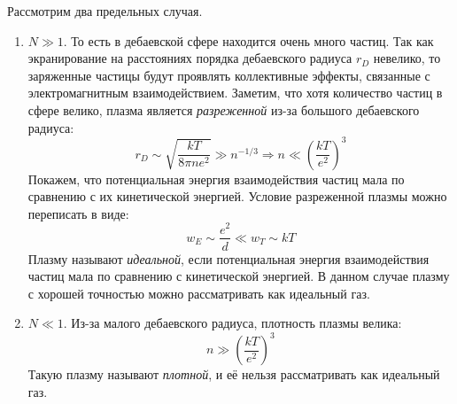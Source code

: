 Рассмотрим два предельных случая.
\begin{enumerate}
	\item $N \gg 1$. То есть в дебаевской сфере находится очень много частиц. Так как экранирование на расстояниях порядка дебаевского радиуса $r_D$ невелико, то заряженные частицы будут проявлять коллективные эффекты, связанные с электромагнитным взаимодействием. Заметим, что хотя количество частиц в сфере велико, плазма является \textit{разреженной} из-за большого дебаевского радиуса:
	$$
	r_D \sim \sqrt{\frac{kT}{8 \pi n e^2}} \gg n^{-1/3} \Rightarrow n \ll \left( \frac{kT}{e^2} \right)^3
	$$
	Покажем, что потенциальная энергия взаимодействия частиц мала по сравнению с их кинетической энергией. Условие разреженной плазмы можно переписать в виде:
	$$w_E \sim \frac{e^2}{d} \ll w_T \sim kT$$
	Плазму называют \textit{идеальной}, если потенциальная энергия взаимодействия частиц мала по сравнению с кинетической энергией. В данном случае плазму с хорошей точностью можно рассматривать как идеальный газ.
	
	\item $N \ll 1$. Из-за малого дебаевского радиуса, плотность плазмы велика:
	$$n \gg \left( \frac{kT}{e^2} \right)^3$$
	Такую плазму называют \textit{плотной}, и её нельзя рассматривать как идеальный газ.
\end{enumerate}

